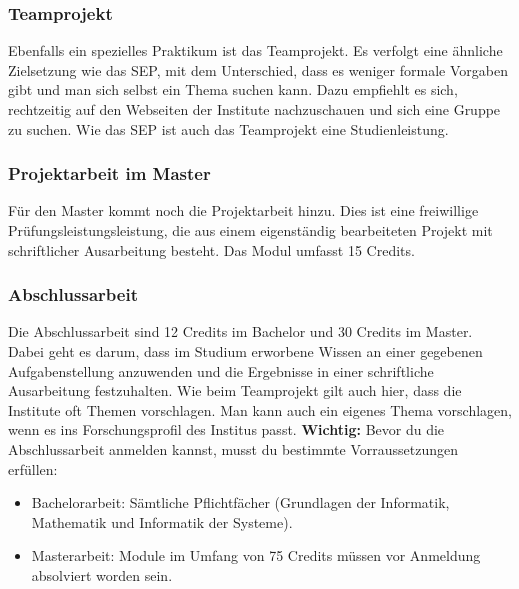 	\subsubsection*{Teamprojekt}
	Ebenfalls ein spezielles Praktikum ist das Teamprojekt. Es verfolgt eine ähnliche Zielsetzung wie das SEP, mit dem Unterschied, dass es weniger formale Vorgaben gibt und man sich selbst ein Thema suchen kann. Dazu empfiehlt es sich, rechtzeitig auf den Webseiten der Institute nachzuschauen und sich eine Gruppe zu suchen. Wie das SEP ist auch das Teamprojekt eine Studienleistung.

	\subsubsection{Projektarbeit im Master}
	Für den Master kommt noch die Projektarbeit hinzu. Dies ist eine
	freiwillige Prüfungsleistungsleistung, die aus einem eigenständig
	bearbeiteten Projekt mit schriftlicher Ausarbeitung besteht. Das Modul umfasst 15 Credits.

	\subsubsection{Abschlussarbeit}
	Die Abschlussarbeit sind 12 Credits im Bachelor und 30 Credits im Master. Dabei geht es darum, dass im Studium erworbene Wissen an einer gegebenen Aufgabenstellung anzuwenden und  die Ergebnisse in einer schriftliche Ausarbeitung festzuhalten. Wie beim Teamprojekt gilt auch hier, dass die Institute oft Themen vorschlagen.  Man kann auch ein eigenes Thema vorschlagen, wenn es ins Forschungsprofil des Institus passt. \textbf{Wichtig:} Bevor du die Abschlussarbeit anmelden kannst, musst du bestimmte Vorraussetzungen erfüllen:

	\begin{itemize}
		\item Bachelorarbeit: Sämtliche Pflichtfächer (Grundlagen der Informatik, Mathematik und Informatik der Systeme).
		\item Masterarbeit: Module im Umfang von 75 Credits müssen vor Anmeldung absolviert worden sein.
	\end{itemize}

